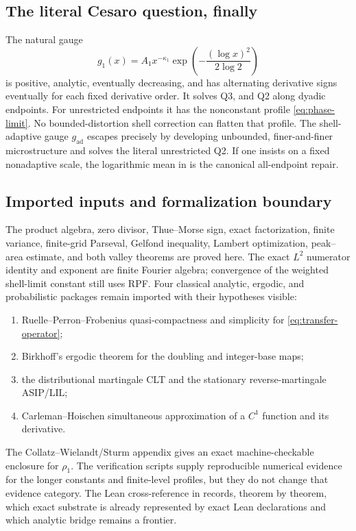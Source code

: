 \documentclass[11pt,oneside]{article}
\numberwithin{equation}{section}
\theoremstyle{definition}
\theoremstyle{remark}
\begin{document}
\subsection{The literal Cesaro question, finally}

The natural gauge
\[
 g_1(x)=A_1x^{-\kappa_1}
 \exp\!\left(-\frac{(\log x)^2}{2\log2}\right)
\]
is positive, analytic, eventually decreasing, and has alternating derivative signs
eventually for each fixed derivative order.  It solves Q3, and Q2 along dyadic endpoints.
For unrestricted endpoints it has the nonconstant profile
\eqref{eq:phase-limit}.  No bounded-distortion shell correction can flatten that profile.
The shell-adaptive gauge $g_{\mathrm{ad}}$ escapes precisely by developing unbounded,
finer-and-finer microstructure and solves the literal unrestricted Q2.  If one insists on a
fixed nonadaptive scale, the logarithmic mean in  is the canonical
all-endpoint repair.

\subsection{Imported inputs and formalization boundary}

The product algebra, zero divisor, Thue--Morse sign, exact factorization, finite variance,
finite-grid Parseval, Gelfond inequality, Lambert optimization, peak--area estimate, and both
valley theorems are proved here.  The exact $L^2$ numerator identity and exponent are finite
Fourier algebra; convergence of the weighted shell-limit constant still uses RPF.  Four
classical analytic, ergodic, and probabilistic packages remain imported with their hypotheses
visible:

\begin{enumerate}
\item Ruelle--Perron--Frobenius quasi-compactness and simplicity for
      \eqref{eq:transfer-operator};
\item Birkhoff's ergodic theorem for the doubling and integer-base maps;
\item the distributional martingale CLT and the stationary reverse-martingale ASIP/LIL;
\item Carleman--Hoischen simultaneous approximation of a $C^1$ function and its derivative.
\end{enumerate}

The Collatz--Wielandt/Sturm appendix gives an exact machine-checkable enclosure for
$\rho_1$.  The verification scripts supply reproducible numerical evidence for the longer
constants and finite-level profiles, but they do not change that evidence category.  The
Lean cross-reference in  records, theorem by theorem, which exact
substrate is already represented by exact Lean declarations and which analytic bridge remains a frontier.
\end{document}
